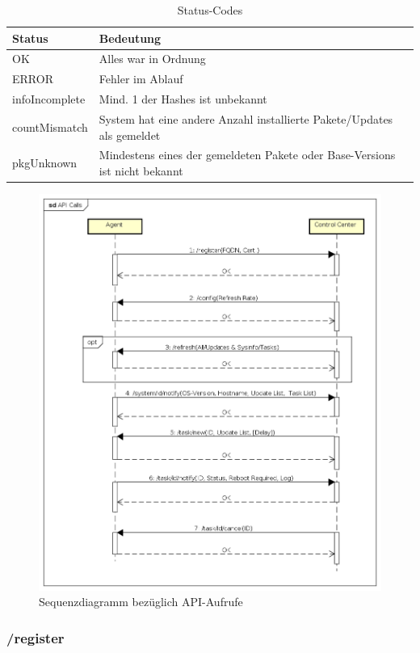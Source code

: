 \begin{table}[]
\centering
\caption{Status-Codes}
\label{api:codes}
\begin{tabular}{ll}
\hline
\textbf{Status} & \textbf{Bedeutung}                                                          \\ \hline
OK              & Alles war in Ordnung                                                        \\
ERROR           & Fehler im Ablauf                                                            \\
infoIncomplete  & Mind. 1 der Hashes ist unbekannt                                            \\
countMismatch   & System hat eine andere Anzahl installierte Pakete/Updates als gemeldet      \\
pkgUnknown      & Mindestens eines der gemeldeten Pakete oder Base-Versions ist nicht bekannt \\ \hline
\end{tabular}
\end{table}


\begin{figure}
  \centering
    \includegraphics[width=\textwidth]{fig/API_Calls}
  \caption{Sequenzdiagramm bezüglich API-Aufrufe}
  \label{fig:api_sequence_diagram}
\end{figure}

\subsubsection{/register}